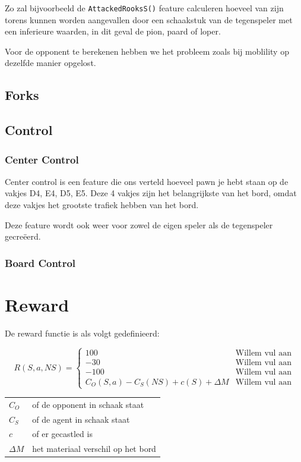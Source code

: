 \documentclass[a4paper,openany]{uantwerpenassignment}
\makeatletter
\newenvironment{conditions}
  {\par\vspace{\abovedisplayskip}\noindent\begin{tabular}{>{$}l<{$} @{${}={}$} l}}
  {\end{tabular}\par\vspace{\belowdisplayskip}}
\newcommand{\codeword}[1]{
    \colorbox{code}{\texttt{\textcolor{codetext}{#1}}}
}
\makeatother
\begin{document}
Zo zal bijvoorbeeld de \codeword{AttackedRooksS()} feature calculeren hoeveel van zijn torens kunnen worden aangevallen door een schaakstuk van de tegenspeler met een inferieure waarden, in dit geval de pion, paard of loper.

Voor de opponent te berekenen hebben we het probleem zoals bij moblility op dezelfde manier opgelost.

\subsection{Forks}
\subsection{Control}
\subsubsection{Center Control}
Center control is een feature die ons verteld hoeveel pawn je hebt staan op de vakjes D4, E4, D5, E5. Deze 4 vakjes zijn het belangrijkste van het bord, omdat deze vakjes het grootste trafiek hebben van het bord.

Deze feature wordt ook weer voor zowel de eigen speler als de tegenspeler gecreëerd.

\subsubsection{Board Control}

\section{Reward}

De reward functie is als volgt gedefinieerd:


$$
R(S, a, NS) = 
\begin{cases}
    100 &\mbox{Willem vul aan}\\
    -30 &\mbox{Willem vul aan}\\
    -100 &\mbox{Willem vul aan}\\
     C_O(S, a) - C_S(NS) + c(S) + \Delta M &\mbox{Willem vul aan}
\end{cases}
$$

\begin{conditions}
    C_O & of de opponent in schaak staat\\
    C_S & of de agent in schaak staat\\
    c &   of er gecastled is\\
    \Delta M & het materiaal verschil op het bord
\end{conditions}
\end{document}
